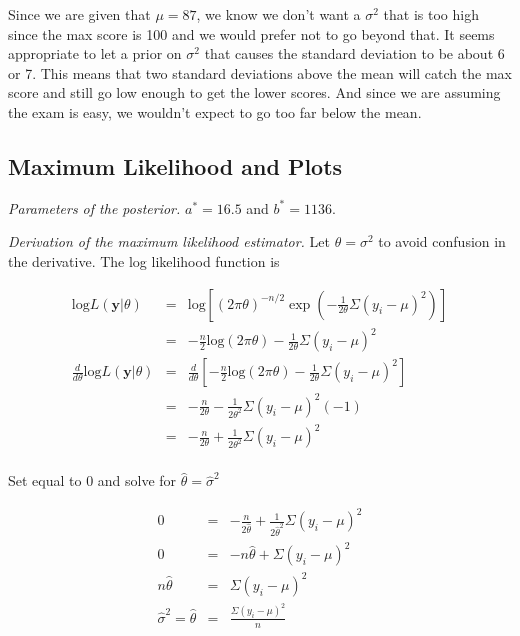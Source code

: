 \documentclass[12pt]{article}
\begin{document}
\noindent Since we are given that $\mu=87$, we know we don't want a $\sigma^2$ that is too high since the max score is 100 and we would prefer not to go beyond that.  It seems appropriate to let a prior on $\sigma^2$ that causes the standard deviation to be about 6 or 7.  This means that two standard deviations above the mean will catch the max score and still go low enough to get the lower scores.  And since we are assuming the exam is easy, we wouldn't expect to go too far below the mean.

\subsection{Maximum Likelihood and Plots}

\noindent \emph{Parameters of the posterior.} $a^*=16.5$ and $b^*=1136$.
\bigskip

\noindent \emph{Derivation of the maximum likelihood estimator.}  Let $\theta=\sigma^2$ to avoid confusion in the derivative.  The log likelihood function is

\begin{eqnarray*}
\mathrm{log}L(\mathbf{y}|\theta) &=& \mathrm{log}\left[(2\pi\theta)^{-n/2}\exp\left(-\frac{1}{2\theta}\Sigma(y_i-\mu)^2\right)\right] \\
&=& -\frac{n}{2}\mathrm{log}(2\pi\theta)-\frac{1}{2\theta}\Sigma(y_i-\mu)^2 \\
\frac{d}{d\theta}\mathrm{log}L(\mathbf{y}|\theta) &=& \frac{d}{d\theta}\left[-\frac{n}{2}\mathrm{log}(2\pi\theta)-\frac{1}{2\theta}\Sigma(y_i-\mu)^2\right] \\
&=& -\frac{n}{2\theta}-\frac{1}{2\theta^2}\Sigma(y_i-\mu)^2(-1) \\
&=& -\frac{n}{2\theta}+\frac{1}{2\theta^2}\Sigma(y_i-\mu)^2 \\
\end{eqnarray*}

\noindent Set equal to 0 and solve for $\hat{\theta}=\hat{\sigma}^2$

\begin{eqnarray*}
0 &=& -\frac{n}{2\hat{\theta}}+\frac{1}{2\hat{\theta}^2}\Sigma(y_i-\mu)^2 \\
0 &=& -n\hat{\theta}+\Sigma(y_i-\mu)^2 \\
n\hat{\theta} &=& \Sigma(y_i-\mu)^2 \\
\hat{\sigma}^2=\hat{\theta} &=& \frac{\Sigma(y_i-\mu)^2}{n} \\
\end{eqnarray*}
\end{document}
